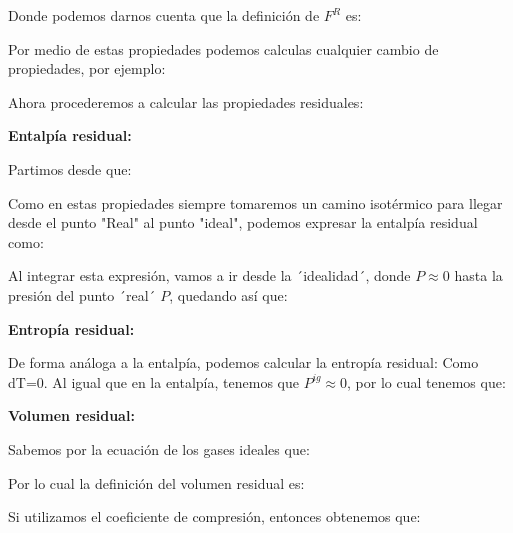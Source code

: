 Donde podemos darnos cuenta que la definición de $F^R$ es:


Por medio de estas propiedades podemos calculas cualquier cambio de propiedades, por ejemplo:


Ahora procederemos a calcular las propiedades residuales:
\vspace{0.5cm}

\textbf{Entalpía residual:}

Partimos desde que:


Como en estas propiedades siempre tomaremos un camino isotérmico para llegar desde el punto "Real" al punto "ideal", podemos expresar la entalpía residual como:


Al integrar esta expresión, vamos a ir desde la  ´idealidad´, donde $P\approx 0$ hasta la presión del punto ´real´ $P$, quedando así que:



\vspace{0.5cm}
\textbf{Entropía residual:}

De forma análoga a la entalpía, podemos calcular la entropía residual:
Como dT=0.
Al igual que en la entalpía, tenemos que $P^{ig}\approx 0$, por lo cual tenemos que:

\vspace{0.5cm}
\textbf{Volumen residual:}

Sabemos por la ecuación de los gases ideales que:

Por lo cual la definición del volumen residual es:


Si utilizamos el coeficiente de compresión, entonces obtenemos que:


